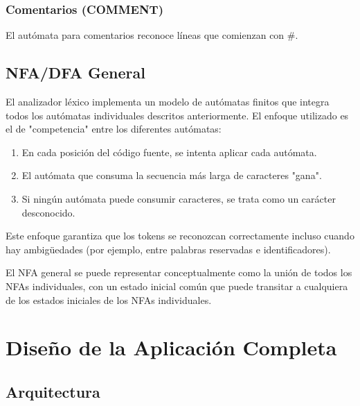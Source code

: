 \documentclass[12pt,letterpaper]{report}
\begin{document}
\subsection{Comentarios (COMMENT)}

El autómata para comentarios reconoce líneas que comienzan con \#.


\section{NFA/DFA General}

El analizador léxico implementa un modelo de autómatas finitos que integra todos los autómatas individuales descritos anteriormente. El enfoque utilizado es el de "competencia" entre los diferentes autómatas:

\begin{enumerate}
    \item En cada posición del código fuente, se intenta aplicar cada autómata.
    \item El autómata que consuma la secuencia más larga de caracteres "gana".
    \item Si ningún autómata puede consumir caracteres, se trata como un carácter desconocido.
\end{enumerate}

Este enfoque garantiza que los tokens se reconozcan correctamente incluso cuando hay ambigüedades (por ejemplo, entre palabras reservadas e identificadores).

El NFA general se puede representar conceptualmente como la unión de todos los NFAs individuales, con un estado inicial común que puede transitar a cualquiera de los estados iniciales de los NFAs individuales.

\chapter{Diseño de la Aplicación Completa}

\section{Arquitectura}
\end{document}
